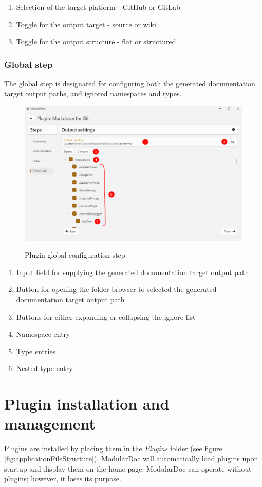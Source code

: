 \begin{enumerate}
    \item Selection of the target platform - GitHub or GitLab
    \item Toggle for the output target - source or wiki
    \item Toggle for the output structure - flat or structured
\end{enumerate}

\pagebreak
\subsubsection{Global step}

The global step is designated for configuring both the generated documentation target output paths, and ignored namespaces and types.

\begin{figure}[H]
    \includegraphics[width=\linewidth]{img/modularDocGlobalSettings.png}
    \label{fig:modularGlobal}
    \caption{Plugin global configuration step}
\end{figure}

\begin{enumerate}
    \item Input field for supplying the generated documentation target output path
    \item Button for opening the folder browser to selected the generated documentation target output path
    \item Buttons for either expanding or collapsing the ignore list
    \item Namespace entry
    \item Type entries
    \item Nested type entry
\end{enumerate}

\section{Plugin installation and management}

Plugins are installed by placing them in the \textit{Plugins} folder (see figure \ref{fig:applicationFileStructure}). ModularDoc will automatically load plugins upon startup and display them on the home page. ModularDoc can operate without plugins; however, it loses its purpose.




